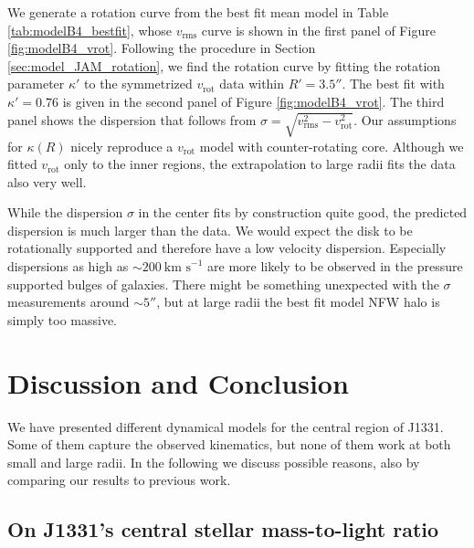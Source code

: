 \documentclass[useAMS,usenatbib]{mnras}
\begin{document}
We generate a rotation curve from the best fit mean model in Table \ref{tab:modelB4_bestfit}, whose $v_\text{rms}$ curve is shown in the first panel of Figure \ref{fig:modelB4_vrot}. Following the procedure in Section \ref{sec:model_JAM_rotation}, we find the rotation curve by fitting the rotation parameter $\kappa'$ to the symmetrized $v_\text{rot}$ data within $R' = 3.5''$. The best fit with $\kappa' = 0.76$ is given in the second panel of Figure \ref{fig:modelB4_vrot}. The third panel shows the dispersion that follows from $\sigma = \sqrt{v_\text{rms}^2 - v_\text{rot}^2}$. Our assumptions for $\kappa(R)$ nicely reproduce a $v_\text{rot}$ model with counter-rotating core. Although we fitted $v_\text{rot}$ only to the inner regions, the extrapolation to large radii fits the data also very well.

While the dispersion $\sigma$ in the center fits by construction quite good, the predicted dispersion is much larger than the data. We would expect the disk to be rotationally supported and therefore have a low velocity dispersion. Especially dispersions as high as $\sim 200~\text{km s}^{-1}$ are more likely to be observed in the pressure supported bulges of galaxies. There might be something unexpected with the $\sigma$ measurements around $\sim 5''$, but at large radii the best fit model NFW halo is simply too massive.

\section{Discussion and Conclusion} \label{sec:Discussion}

We have presented different dynamical models for the central region of J1331. Some of them capture the observed kinematics, but none of them work at both small and large radii. In the following we discuss possible reasons, also by comparing our results to previous work.

\subsection{On J1331's central stellar mass-to-light ratio} \label{sec:MLdiscussion}
\end{document}
